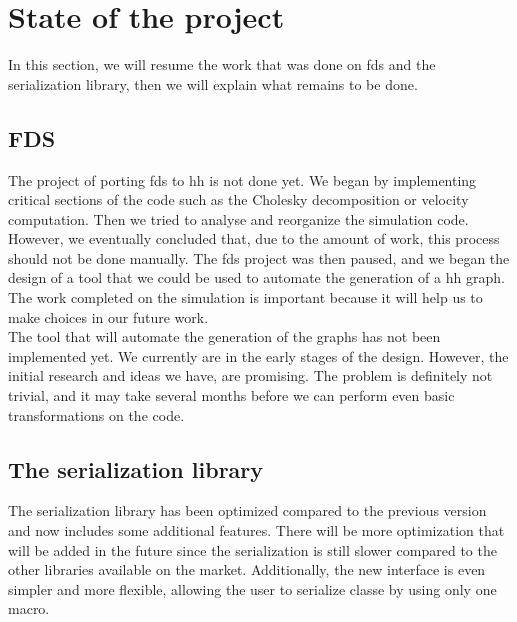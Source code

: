 
\section{State of the project}

In this section, we will resume the work that was done on \gls{fds} and the
serialization library, then we will explain what remains to be done.

\subsection{FDS}

The project of porting \gls{fds} to \gls{hh} is not done yet. We began by
implementing critical sections of the code such as the Cholesky decomposition or
velocity computation. Then we tried to analyse and reorganize the simulation
code. However, we eventually concluded that, due to the amount of work, this
process should not be done manually. The \gls{fds} project was then paused, and
we began the design of a tool that we could be used to automate the generation
of a \gls{hh} graph. The work completed on the simulation is important because
it will help us to make choices in our future work.\\

The tool that will automate the generation of the graphs has not been
implemented yet. We currently are in the early stages of the design. However,
the initial research and ideas we have, are promising. The problem is definitely
not trivial, and it may take several months before we can perform even basic
transformations on the code.

\subsection{The serialization library}

The serialization library has been optimized compared to the previous version
and now includes some additional features. There will be more optimization that
will be added in the future since the serialization is still slower compared to
the other libraries available on the market. Additionally, the new interface is
even simpler and more flexible, allowing the user to serialize classe by using
only one macro.
